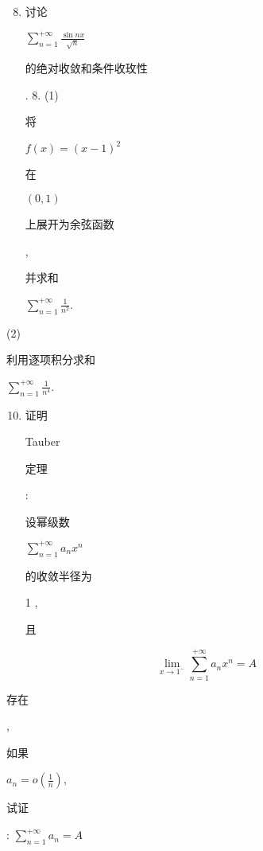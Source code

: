 \documentclass[10pt]{article}
\begin{document}
\begin{enumerate}
  \setcounter{enumi}{7}
  \item \begin{CJK}{UTF8}{mj}讨论\end{CJK} $\sum_{n=1}^{+\infty} \frac{\sin n x}{\sqrt{n}}$ \begin{CJK}{UTF8}{mj}的绝对收敛和条件收玫性\end{CJK}. 8. (1) \begin{CJK}{UTF8}{mj}将\end{CJK} $f(x)=(x-1)^{2}$ \begin{CJK}{UTF8}{mj}在\end{CJK} $(0,1)$ \begin{CJK}{UTF8}{mj}上展开为余弦函数\end{CJK}, \begin{CJK}{UTF8}{mj}并求和\end{CJK} $\sum_{n=1}^{+\infty} \frac{1}{n^{2}}$.
\end{enumerate}
(2) \begin{CJK}{UTF8}{mj}利用逐项积分求和\end{CJK} $\sum_{n=1}^{+\infty} \frac{1}{n^{4}}$.

\begin{enumerate}
  \setcounter{enumi}{9}
  \item \begin{CJK}{UTF8}{mj}证明\end{CJK} Tauber \begin{CJK}{UTF8}{mj}定理\end{CJK}: \begin{CJK}{UTF8}{mj}设幂级数\end{CJK} $\sum_{n=1}^{+\infty} a_{n} x^{n}$ \begin{CJK}{UTF8}{mj}的收敛半径为\end{CJK} 1 , \begin{CJK}{UTF8}{mj}且\end{CJK}
\end{enumerate}
$$
\lim _{x \rightarrow 1^{-}} \sum_{n=1}^{+\infty} a_{n} x^{n}=A
$$
\begin{CJK}{UTF8}{mj}存在\end{CJK}, \begin{CJK}{UTF8}{mj}如果\end{CJK} $a_{n}=o\left(\frac{1}{n}\right)$, \begin{CJK}{UTF8}{mj}试证\end{CJK}: $\sum_{n=1}^{+\infty} a_{n}=A$
\end{document}
